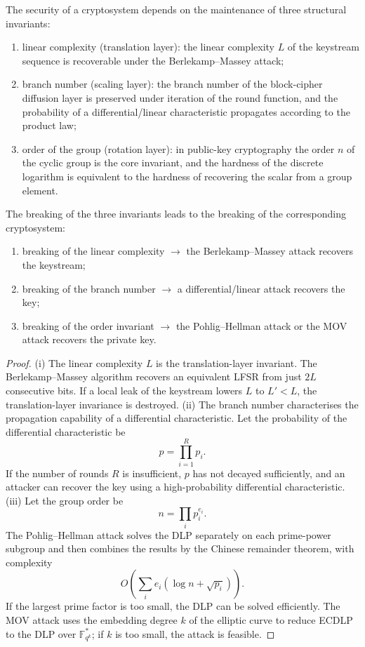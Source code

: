 \begin{theorem}\label{thm:crypto_invariants}
The security of a cryptosystem depends on the maintenance of three structural invariants:
\begin{enumerate}[label=(\roman*)]
    \item linear complexity (translation layer): the linear complexity \(L\) of the keystream sequence is recoverable under the Berlekamp--Massey attack;
    \item branch number (scaling layer): the branch number of the block-cipher diffusion layer is preserved under iteration of the round function, and the probability of a differential/linear characteristic propagates according to the product law;
    \item order of the group (rotation layer): in public-key cryptography the order \(n\) of the cyclic group is the core invariant, and the hardness of the discrete logarithm is equivalent to the hardness of recovering the scalar from a group element.
\end{enumerate}
The breaking of the three invariants leads to the breaking of the corresponding cryptosystem:
\begin{enumerate}[label=(\roman*)]
    \item breaking of the linear complexity \(\to\) the Berlekamp--Massey attack recovers the keystream;
    \item breaking of the branch number \(\to\) a differential/linear attack recovers the key;
    \item breaking of the order invariant \(\to\) the Pohlig--Hellman attack or the MOV attack recovers the private key.
\end{enumerate}
\end{theorem}

\begin{proof}
(i) The linear complexity \(L\) is the translation-layer invariant. The Berlekamp--Massey algorithm recovers an equivalent LFSR from just \(2L\) consecutive bits. If a local leak of the keystream lowers \(L\) to \(L'<L\), the translation-layer invariance is destroyed.
(ii) The branch number characterises the propagation capability of a differential characteristic. Let the probability of the differential characteristic be
\[
p=\prod_{i=1}^{R}p_i.
\]
If the number of rounds \(R\) is insufficient, \(p\) has not decayed sufficiently, and an attacker can recover the key using a high-probability differential characteristic.
(iii) Let the group order be
\[
n=\prod_i p_i^{e_i}.
\]
The Pohlig--Hellman attack solves the DLP separately on each prime-power subgroup and then combines the results by the Chinese remainder theorem, with complexity
\[
O\left(\sum_i e_i(\log n+\sqrt{p_i})\right).
\]
If the largest prime factor is too small, the DLP can be solved efficiently. The MOV attack uses the embedding degree \(k\) of the elliptic curve to reduce ECDLP to the DLP over \(\mathbb F_{q^k}^*\); if \(k\) is too small, the attack is feasible.
\end{proof}

